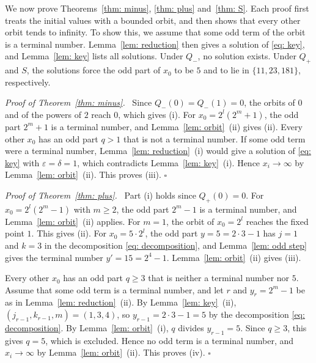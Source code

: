 \documentclass{article}
\newenvironment{proof}[1][Proof]{\par\medskip\noindent\textit{#1.}\ }{\hfill$\square$\par\medskip}
\newcommand{\Ge}{\geqslant}
\begin{document}
We now prove Theorems~\ref{thm: minus}, \ref{thm: plus} and~\ref{thm: S}. Each proof first treats the initial values with a bounded orbit, and then shows that every other orbit tends to infinity. To show this, we assume that some odd term of the orbit is a terminal number. Lemma~\ref{lem: reduction} then gives a solution of \eqref{eq: key}, and Lemma~\ref{lem: key} lists all solutions. Under $Q_-$, no solution exists. Under $Q_+$ and $S$, the solutions force the odd part of $x_0$ to be $5$ and to lie in $\{11, 23, 181\}$, respectively.

\begin{proof}[Proof of Theorem~\ref{thm: minus}]
    Since $Q_-(0) = Q_-(1) = 0$, the orbits of $0$ and of the powers of $2$ reach $0$, which gives (i). For $x_0 = 2^l (2^m + 1)$, the odd part $2^m + 1$ is a terminal number, and Lemma~\ref{lem: orbit}~(ii) gives (ii). Every other $x_0$ has an odd part $q > 1$ that is not a terminal number. If some odd term were a terminal number, Lemma~\ref{lem: reduction}~(i) would give a solution of \eqref{eq: key} with $\varepsilon = \delta = 1$, which contradicts Lemma~\ref{lem: key}~(i). Hence $x_i \to \infty$ by Lemma~\ref{lem: orbit}~(ii). This proves (iii).
\end{proof}

\begin{proof}[Proof of Theorem~\ref{thm: plus}]
    Part (i) holds since $Q_+(0) = 0$. For $x_0 = 2^l (2^m - 1)$ with $m \Ge 2$, the odd part $2^m - 1$ is a terminal number, and Lemma~\ref{lem: orbit}~(ii) applies. For $m = 1$, the orbit of $x_0 = 2^l$ reaches the fixed point $1$. This gives (ii). For $x_0 = 5 \cdot 2^l$, the odd part $y = 5 = 2 \cdot 3 - 1$ has $j = 1$ and $k = 3$ in the decomposition \eqref{eq: decomposition}, and Lemma~\ref{lem: odd step} gives the terminal number $y' = 15 = 2^4 - 1$. Lemma~\ref{lem: orbit}~(ii) gives (iii).

    Every other $x_0$ has an odd part $q \Ge 3$ that is neither a terminal number nor $5$. Assume that some odd term is a terminal number, and let $r$ and $y_r = 2^m - 1$ be as in Lemma~\ref{lem: reduction}~(ii). By Lemma~\ref{lem: key}~(ii), $(j_{r-1}, k_{r-1}, m) = (1, 3, 4)$, so $y_{r-1} = 2 \cdot 3 - 1 = 5$ by the decomposition \eqref{eq: decomposition}. By Lemma~\ref{lem: orbit}~(i), $q$ divides $y_{r-1} = 5$. Since $q \Ge 3$, this gives $q = 5$, which is excluded. Hence no odd term is a terminal number, and $x_i \to \infty$ by Lemma~\ref{lem: orbit}~(ii). This proves (iv).
\end{proof}
\end{document}
